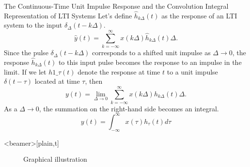 \begin{frame}{The Continuous-Time Unit Impulse Response and the Convolution Integral Representation of LTI Systems}
    Let's  define $\hat{h}_{k\Delta}(t)$ as the response of an LTI system to the input $\delta_\Delta(t- k\Delta)$.
    \begin{equation*}
        \hat{y}(t) =  \sum_{k=-\infty}^{\infty} x(k\Delta)\hat{h}_{k\Delta}(t)\Delta.
    \end{equation*}
    Since the pulse $\delta_\Delta(t - k\Delta)$ corresponds to a shifted unit impulse as $\Delta \rightarrow 0$, the response $\hat{h}_{k\Delta}(t)$ to this input pulse becomes the response to an impulse in the limit. If we let $h1\_\tau(t)$ denote the response at time $t$ to a unit impulse $\delta(t - \tau)$ located at time $\tau$, then
    \begin{equation*}
        {y}(t) =  \lim_{\Delta \rightarrow 0} \sum_{k=-\infty}^{\infty} x(k\Delta){h}_{k\Delta}(t)\Delta.
    \end{equation*}
    As a $\Delta \rightarrow 0$, the summation on the right-hand side becomes an integral.
    \begin{equation*}
        y(t) = \int_{-\infty}^{\infty} x(\tau)h_\tau(t)d\tau
    \end{equation*}
    \pause
    {
    }

\end{frame}


\begin{frame}<beamer>[plain,t]
    {
    \begin{figure}
      \centering
      
      \caption{Graphical illustration}\label{fi:conv_integral}
    \end{figure}
    }
\end{frame}

